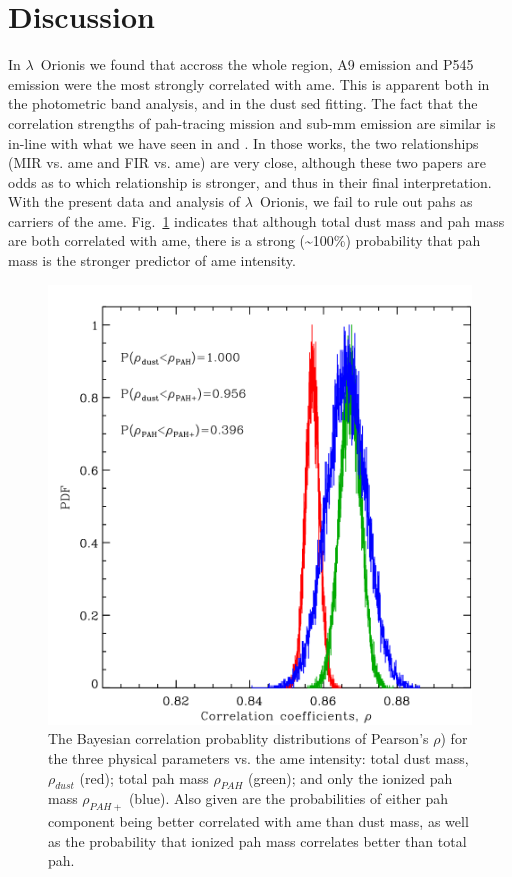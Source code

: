   \section{Discussion}
  \label{sec:lori_discussion}
      In  $\lambda$~Orionis we found that accross the whole region, A9 emission and P545 emission were the most strongly correlated with \acrshort{ame}. This is apparent both in the photometric band analysis, and in the dust \acrshort{sed} fitting.  The fact that the correlation strengths of \acrshort{pah}-tracing mission and sub-mm emission are similar is in-line with what we have seen in \cite{ysard10b} and \cite{hensley16}. In those works, the two relationships (MIR vs. \acrshort{ame} and FIR vs. \acrshort{ame}) are very close, although these two papers are odds as to which relationship is stronger, and thus in their final interpretation. With the present data and analysis of $\lambda$~Orionis, we fail to rule out \acrshort{pah}s as carriers of the \acrshort{ame}. Fig.~\ref{fig:fred_LOri_notes_Oct2017_fig2c} indicates that although total dust mass and \acrshort{pah} mass are both correlated with \acrshort{ame}, there is a strong (\textasciitilde{}100\%) probability that \acrshort{pah} mass is the stronger predictor of \acrshort{ame} intensity.
          \begin{figure}
            \includegraphics[width=\textwidth]{../Plots/ch_lori/fred_LOri_notes_Oct2017_fig2c.pdf}
            \centering
            \caption{ The Bayesian correlation probablity distributions of Pearson's $\rho{}$) for the three physical parameters vs. the \acrshort{ame} intensity: total dust mass, $\rho_{dust}$ (red); total \acrshort{pah} mass $\rho_{PAH}$ (green); and only the ionized \acrshort{pah} mass $\rho_{PAH+}$ (blue). Also given are the probabilities of either \acrshort{pah} component being better correlated with \acrshort{ame} than dust mass, as well as the probability that ionized \acrshort{pah} mass correlates better than total \acrshort{pah}.}
            \label{fig:fred_LOri_notes_Oct2017_fig2c}
          \end{figure}
